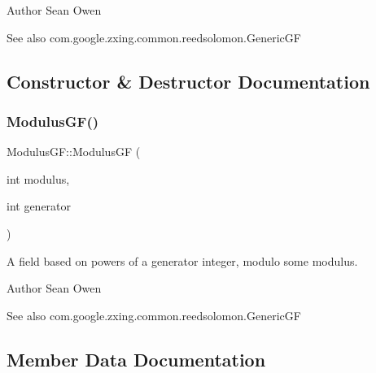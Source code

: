 \begin{DoxyAuthor}{Author}
Sean Owen 
\end{DoxyAuthor}
\begin{DoxySeeAlso}{See also}
com.\+google.\+zxing.\+common.\+reedsolomon.\+Generic\+GF 
\end{DoxySeeAlso}


\subsection{Constructor \& Destructor Documentation}
\mbox{\label{classzxing_1_1pdf417_1_1decoder_1_1ec_1_1_modulus_g_f_ac84c5c931195a31959169e0a1c20b564}} 
\subsubsection{\texorpdfstring{Modulus\+G\+F()}{ModulusGF()}}
{\footnotesize\ttfamily Modulus\+G\+F\+::\+Modulus\+GF (\begin{DoxyParamCaption}\item[{int}]{modulus,  }\item[{int}]{generator }\end{DoxyParamCaption})}

A field based on powers of a generator integer, modulo some modulus.

\begin{DoxyAuthor}{Author}
Sean Owen 
\end{DoxyAuthor}
\begin{DoxySeeAlso}{See also}
com.\+google.\+zxing.\+common.\+reedsolomon.\+Generic\+GF 
\end{DoxySeeAlso}


\subsection{Member Data Documentation}
\mbox{\label{classzxing_1_1pdf417_1_1decoder_1_1ec_1_1_modulus_g_f_a571ec964dd17f9d98cd347e9cb4e8e5d}} 
